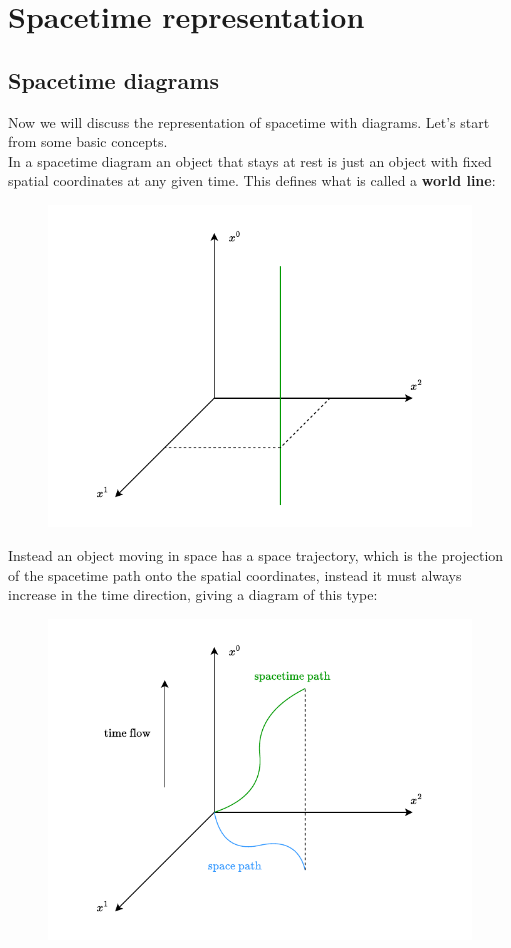 \chapter{Spacetime representation}
\section{Spacetime diagrams}
Now we will discuss the representation of spacetime with diagrams. Let's start from some basic concepts.\\
In a spacetime diagram an object that stays at rest is just an object with fixed spatial coordinates at any given time. This defines what is called a \textbf{world line}:
\begin{figure}[H]
  \centering
  \includegraphics[width=0.8\linewidth]{res/svg/World_line.drawio}
\end{figure}
Instead an object moving in space has a space trajectory, which is the projection of the spacetime path onto the spatial coordinates, instead it must always increase in the time direction, giving a diagram of this type:
\begin{figure}[H]
  \centering
  \includegraphics[width=0.8\linewidth]{res/svg/spacetime_path.drawio}
\end{figure}

